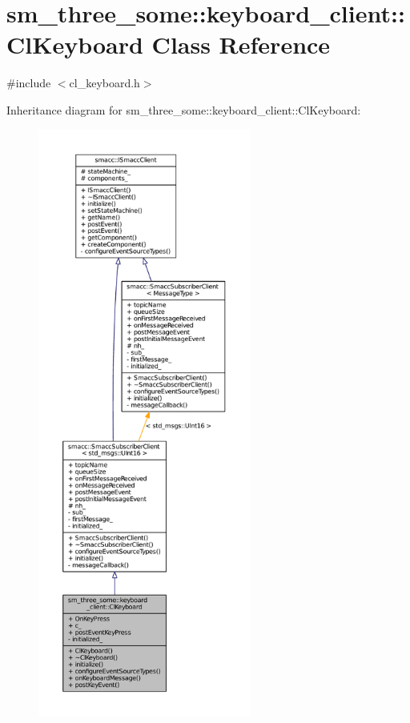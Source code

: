 \hypertarget{classsm__three__some_1_1keyboard__client_1_1ClKeyboard}{}\section{sm\+\_\+three\+\_\+some\+:\+:keyboard\+\_\+client\+:\+:Cl\+Keyboard Class Reference}
\label{classsm__three__some_1_1keyboard__client_1_1ClKeyboard}


{\ttfamily \#include $<$cl\+\_\+keyboard.\+h$>$}



Inheritance diagram for sm\+\_\+three\+\_\+some\+:\+:keyboard\+\_\+client\+:\+:Cl\+Keyboard\+:
\nopagebreak
\begin{figure}[H]
\begin{center}
\leavevmode
\includegraphics[height=550pt]{classsm__three__some_1_1keyboard__client_1_1ClKeyboard__inherit__graph}
\end{center}
\end{figure}


